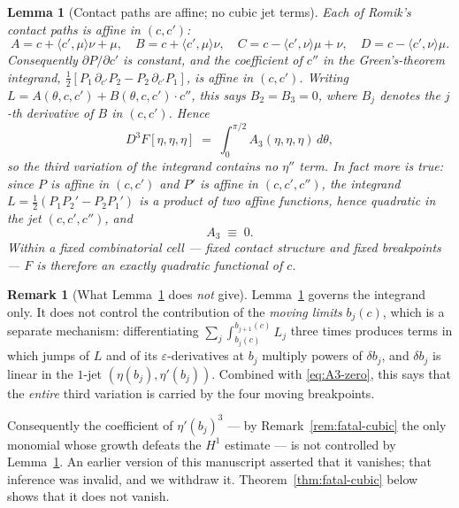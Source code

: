 \documentclass[11pt]{amsart}
\theoremstyle{plain}
\newtheorem{lemma}[theorem]{Lemma}
\theoremstyle{definition}
\newtheorem{remark}[theorem]{Remark}
\begin{document}
\begin{lemma}[Contact paths are affine; no cubic jet
terms]\label{lem:affine}
Each of Romik's contact paths is affine in $(c,c')$:
\[
  A = c + \langle c',\mu\rangle\nu + \mu, \quad
  B = c + \langle c',\mu\rangle\nu, \quad
  C = c - \langle c',\nu\rangle\mu + \nu, \quad
  D = c - \langle c',\nu\rangle\mu .
\]
Consequently $\partial P/\partial c'$ is constant, and the coefficient
of $c''$ in the Green's-theorem integrand,
$\tfrac12[P_{1}\,\partial_{c'}P_{2} - P_{2}\,\partial_{c'}P_{1}]$, is
affine in $(c,c')$.  Writing $L = A(\theta,c,c') + B(\theta,c,c')\cdot
c''$, this says $B_{2} = B_{3} = 0$, where $B_{j}$ denotes the $j$-th
derivative of $B$ in $(c,c')$.  Hence
\begin{equation}\label{eq:D3F-nojet}
   D^{3}F[\eta,\eta,\eta]
   \;=\; \int_{0}^{\pi/2} A_{3}(\eta,\eta,\eta)\,d\theta ,
\end{equation}
so the third variation of the integrand contains \emph{no} $\eta''$
term.  In fact more is true: since $P$ is affine in $(c,c')$ and $P'$
is affine in $(c,c',c'')$, the integrand $L=\tfrac12(P_{1}P_{2}'
-P_{2}P_{1}')$ is a product of two affine functions, hence
\emph{quadratic} in the jet $(c,c',c'')$, and
\begin{equation}\label{eq:A3-zero}
   A_{3} \;\equiv\; 0 .
\end{equation}
Within a fixed combinatorial cell --- fixed contact structure and
fixed breakpoints --- $F$ is therefore an exactly quadratic functional
of $c$.
\end{lemma}

\begin{remark}[What Lemma~\ref{lem:affine} does \emph{not} give]
\label{rem:affine-scope}
Lemma~\ref{lem:affine} governs the integrand only.  It does not
control the contribution of the \emph{moving limits} $b_{j}(c)$, which
is a separate mechanism: differentiating
$\sum_{j}\int_{b_{j}(c)}^{b_{j+1}(c)}L_{j}$ three times produces terms
in which jumps of $L$ and of its $\varepsilon$-derivatives at $b_{j}$
multiply powers of $\delta b_{j}$, and $\delta b_{j}$ is linear in the
$1$-jet $(\eta(b_{j}),\eta'(b_{j}))$.  Combined with
\eqref{eq:A3-zero}, this says that the \emph{entire} third variation
is carried by the four moving breakpoints.

Consequently the coefficient of $\eta'(b_{j})^{3}$ --- by
Remark~\ref{rem:fatal-cubic} the only monomial whose growth defeats
the $H^{1}$ estimate --- is not controlled by
Lemma~\ref{lem:affine}.  An earlier version of this manuscript
asserted that it vanishes; that inference was invalid, and we
withdraw it.  Theorem~\ref{thm:fatal-cubic} below shows that it does
not vanish.
\end{remark}
\end{document}
